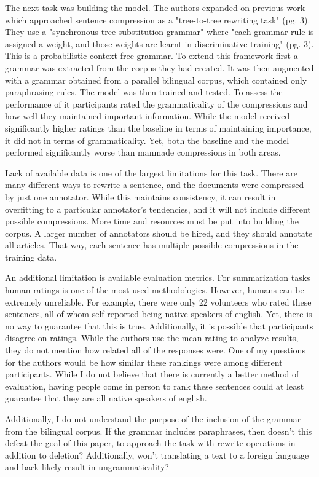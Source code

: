 \documentclass{article}
\begin{document}
    The next task was building the model.  The authors expanded on previous work which approached sentence compression as a "tree-to-tree rewriting task" (pg. 3).  They use a "synchronous tree substitution grammar" where "each grammar rule is assigned a weight, and those weights are learnt in discriminative training" (pg. 3).  This is a probabilistic context-free grammar.  To extend this framework first a grammar was extracted from the corpus they had created.  It was then augmented with a grammar obtained from a parallel bilingual corpus, which contained only paraphrasing rules.  The model was then trained and tested.  To assess the performance of it participants rated the grammaticality of the compressions and how well they maintained important information.  While the model received significantly higher ratings than the baseline in terms of maintaining importance, it did not in terms of grammaticality.  Yet, both the baseline and the model performed significantly worse than manmade compressions in both areas.
  
    Lack of available data is one of the largest limitations for this task.  There are many different ways to rewrite a sentence, and the documents were compressed by just one annotator.  While this maintains consistency, it can result in overfitting to a particular annotator's tendencies, and it will not include different possible compressions. More time and resources must be put into building the corpus. A larger number of annotators should be hired, and they should annotate all articles.  That way, each sentence has multiple possible compressions in the training data. 
  
  An additional limitation is available evaluation metrics.  For summarization tasks human ratings is one of the most used methodologies.  However, humans can be extremely unreliable.  For example, there were only 22 volunteers who rated these sentences, all of whom self-reported being native speakers of english.  Yet, there is no way to guarantee that this is true.  Additionally, it is possible that participants disagree on ratings.  While the authors use the mean rating to analyze results, they do not mention how related all of the responses were.  One of my questions for the authors would be how similar these rankings were among different participants. While I do not believe that there is currently a better method of evaluation, having people come in person to rank these sentences could at least guarantee that they are all native speakers of english.
  
  Additionally, I do not understand the purpose of the inclusion of the grammar from the bilingual corpus.  If the grammar includes paraphrases, then doesn't this defeat the goal of this paper, to approach the task with rewrite operations in addition to deletion?  Additionally, won't translating a text to a foreign language and back likely result in ungrammaticality?
\end{document}
